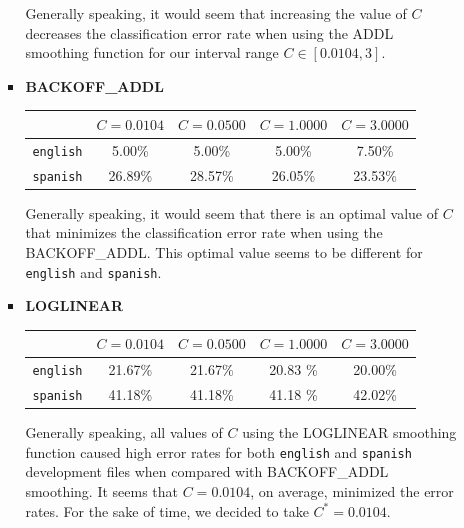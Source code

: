 \documentclass[11pt]{article}
\begin{document}
\begin{enumerate}
\begin{enumerate}[label=(\alph*)]
\begin{itemize}
			Generally speaking, it would seem that increasing the value of $C$ decreases the classification error rate when using the ADDL smoothing function for our interval range $C \in [0.0104, 3]$.
			\vspace{8pt} \\

		\item[] \hspace{-24pt} \textbf{BACKOFF\_ADDL} \vspace{8pt}

			\begin{center}\begin{tabular}{| r || c | c | c | c |}
			\hline
							 & $C=0.0104$ & $C=0.0500$ & $C=1.0000$ & $C=3.0000$ \\
			\hline \hline
			\texttt{english} & 5.00\%     & 5.00\%	   & 5.00\%     & 7.50\%	 \\
			\texttt{spanish} & 26.89\%    & 28.57\%	   & 26.05\%    & 23.53\%	 \\
			\hline
			\end{tabular}\end{center} \vspace{8pt}

			Generally speaking, it would seem that there is an optimal value of $C$ that minimizes the classification error rate when using the BACKOFF\_ADDL. This optimal value seems to be different for \texttt{english} and \texttt{spanish}.
			\vspace{8pt} \\

		\item[] \hspace{-24pt} \textbf{LOGLINEAR} \vspace{8pt}

			\begin{center}\begin{tabular}{| r || c | c | c | c |}
			\hline
							 & $C=0.0104$ & $C=0.0500$ & $C=1.0000$ & $C=3.0000$ \\
			\hline \hline
			\texttt{english} & 21.67\%    & 21.67\%	   & 20.83 \%   & 20.00\%	 \\
			\texttt{spanish} & 41.18\%    & 41.18\%	   & 41.18 \%   & 42.02\%	 \\
			\hline
			\end{tabular}\end{center} \vspace{8pt}

			Generally speaking, all values of $C$ using the LOGLINEAR smoothing function caused high error rates for both \texttt{english} and \texttt{spanish} development files when compared with BACKOFF\_ADDL smoothing. It seems that $C = 0.0104$, on average, minimized the error rates. For the sake of time, we decided to take $C^* = 0.0104$.


\end{itemize}
\end{enumerate}
\end{enumerate}
\end{document}
